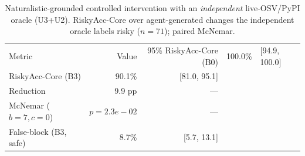\begin{table}[t]\centering
\caption{Naturalistic-grounded controlled intervention with an \emph{independent} live-OSV/PyPI oracle (U3+U2). RiskyAcc-Core over agent-generated changes the independent oracle labels risky ($n=71$); paired McNemar.}
\label{tab:e1a-indep}
\begin{tabular}{lrr}
\toprule
Metric & Value & 95\%%
\midrule
RiskyAcc-Core (B0) & 100.0\% & [94.9, 100.0] \\
RiskyAcc-Core (B3) & 90.1\% & [81.0, 95.1] \\
Reduction & 9.9 pp & --- \\
McNemar ($b{=}7,c{=}0$) & $p{=}2.3e-02$ & --- \\
False-block (B3, safe) & 8.7\% & [5.7, 13.1] \\
\bottomrule
\end{tabular}
\end{table}
